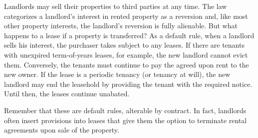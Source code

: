 Landlords may sell their properties to third parties at any time.  The law
categorizes a landlord's interest in rented property as a reversion and, like
most other property interests, the landlord's reversion is fully alienable. 
But what happens to a lease if a property is transferred?  As a default rule,
when a landlord sells his interest, the purchaser takes subject to any leases.
If there are tenants with unexpired term-of-years leases, for example, the new
landlord cannot evict them.  Conversely, the tenants must continue to pay the
agreed upon rent to the new owner.  If the lease is a periodic tenancy (or
tenancy at will), the new landlord may end the leasehold by providing the
tenant with the required notice.  Until then, the leases continue unabated.  

Remember that these are default rules, alterable by contract.  In fact,
landlords often insert provisions into leases that give them the option to
terminate rental agreements upon sale of the property.  

